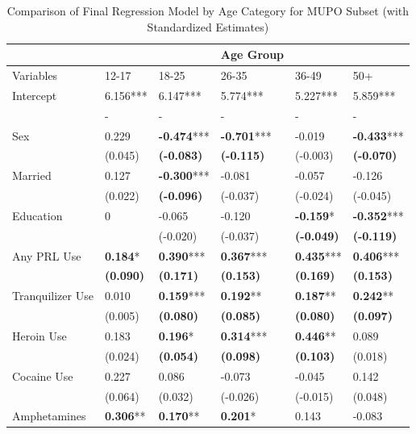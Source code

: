\documentclass[sigconf]{acmart}
\begin{document}

\begin{table*}[ht]
  \caption{Comparison of Final Regression Model by Age Category for MUPO Subset
  (with Standardized Estimates)}
  \label{tab:freq}
  \begin{tabular}{llllll}
    \toprule
      & & & Age Group& &  \\
    \midrule
    Variables & 12-17& 18-25& 26-35& 36-49& 50+  \\
    \midrule
    Intercept& 6.156***& 6.147***& 5.774***& 5.227***& 5.859*** \\
           & -& -& -& -& - \\
    Sex& 0.229& \textbf{-0.474}***& \textbf{-0.701}***& -0.019& \textbf{-0.433}***  \\
           & (0.045)& \textbf{(-0.083)}& \textbf{(-0.115)}& (-0.003)& \textbf{(-0.070)} \\
    Married& 0.127& \textbf{-0.300}***& -0.081& -0.057& -0.126  \\
           & (0.022)& \textbf{(-0.096)}& (-0.037)& (-0.024)& (-0.045) \\
    Education& 0& -0.065& -0.120& \textbf{-0.159}*& \textbf{-0.352}*** \\
           &        & (-0.020)& (-0.037)& \textbf{(-0.049)}& \textbf{(-0.119)} \\
    Any PRL Use& \textbf{0.184}*& \textbf{0.390}***& \textbf{0.367}***& \textbf{0.435}***& \textbf{0.406}***  \\
           & \textbf{(0.090)}& \textbf{(0.171)}& \textbf{(0.153)}& \textbf{(0.169)}& \textbf{(0.153)} \\
    Tranquilizer Use& 0.010& \textbf{0.159}***& \textbf{0.192}**& \textbf{0.187}**& \textbf{0.242}** \\
           & (0.005)& \textbf{(0.080)}& \textbf{(0.085)}& \textbf{(0.080)}& \textbf{(0.097)} \\
    Heroin Use& 0.183& \textbf{0.196}*& \textbf{0.314}***& \textbf{0.446}**& 0.089  \\
           & (0.024)& \textbf{(0.054)}& \textbf{(0.098)}& \textbf{(0.103)}& (0.018) \\
    Cocaine Use& 0.227& 0.086& -0.073& -0.045& 0.142  \\
           & (0.064)& (0.032)& (-0.026)& (-0.015)& (0.048) \\
    Amphetamines& \textbf{0.306}**& \textbf{0.170}**& \textbf{0.201}*& 0.143& -0.083  \\

\end{tabular}
\end{table*}
\end{document}
